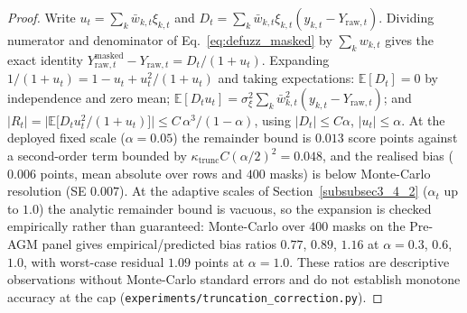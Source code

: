 \documentclass[pdflatex,sn-mathphys-num]{sn-jnl}
\theoremstyle{thmstyleone}
\theoremstyle{thmstyletwo}
\theoremstyle{thmstylethree}
\begin{document}
\begin{proof}
Write $u_t = \sum_k \bar{w}_{k,t}\xi_{k,t}$ and $D_t = \sum_k \bar{w}_{k,t}\xi_{k,t}(y_{k,t} - Y_{\mathrm{raw},t})$. Dividing numerator and denominator of Eq.~\eqref{eq:defuzz_masked} by $\sum_k w_{k,t}$ gives the exact identity $Y^{\text{masked}}_{\mathrm{raw},t} - Y_{\mathrm{raw},t} = D_t/(1 + u_t)$. Expanding $1/(1+u_t) = 1 - u_t + u_t^2/(1+u_t)$ and taking expectations: $\mathbb{E}[D_t] = 0$ by independence and zero mean; $\mathbb{E}[D_t u_t] = \sigma_\xi^2 \sum_k \bar{w}_{k,t}^2 (y_{k,t} - Y_{\mathrm{raw},t})$; and $|R_t| = \bigl|\mathbb{E}\bigl[D_t u_t^2/(1+u_t)\bigr]\bigr| \le C\,\alpha^3/(1-\alpha)$, using $|D_t| \le C\alpha$, $|u_t| \le \alpha$. At the deployed fixed scale ($\alpha = 0.05$) the remainder bound is $0.013$ score points against a second-order term bounded by $\kappa_{\mathrm{trunc}} C (\alpha/2)^2 = 0.048$, and the realised bias ($0.006$ points, mean absolute over rows and $400$ masks) is below Monte-Carlo resolution (SE $0.007$). At the adaptive scales of Section~\ref{subsubsec3_4_2} ($\alpha_t$ up to $1.0$) the analytic remainder bound is vacuous, so the expansion is checked empirically rather than guaranteed: Monte-Carlo over $400$ masks on the Pre-AGM panel gives empirical/predicted bias ratios $0.77$, $0.89$, $1.16$ at $\alpha = 0.3$, $0.6$, $1.0$, with worst-case residual $1.09$ points at $\alpha = 1.0$. These ratios are descriptive observations without Monte-Carlo standard errors and do not establish monotone accuracy at the cap (\texttt{experiments/truncation\_correction.py}).
\end{proof}
\end{document}
